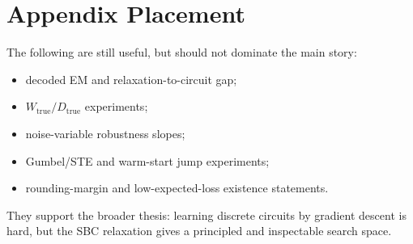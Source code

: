 \documentclass[11pt]{article}
\newcommand{\SBC}{\textsc{SBC}}
\begin{document}
\section{Appendix Placement}

The following are still useful, but should not dominate the main story:
\begin{itemize}[leftmargin=1.5em]
  \item decoded EM and relaxation-to-circuit gap;
  \item \(W_{\mathrm{true}}/D_{\mathrm{true}}\) experiments;
  \item noise-variable robustness slopes;
  \item Gumbel/STE and warm-start jump experiments;
  \item rounding-margin and low-expected-loss existence statements.
\end{itemize}

They support the broader thesis: learning discrete circuits by gradient descent is hard, but the \SBC{} relaxation gives a principled and inspectable search space.
\end{document}
